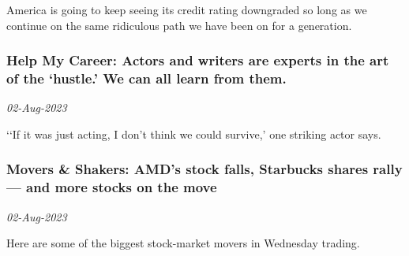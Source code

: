 America is going to keep seeing its credit rating downgraded so long as we continue on the same ridiculous path we have been on for a generation.
\subsubsection{Help My Career: Actors and writers are experts in the art of the ‘hustle.’ We can all learn from them. \href{http://www.marketwatch.com/news/story.asp?guid=%7B20C06575-04D4-B545-7238-437B0D9E1615%7D&siteid=rss&rss=1}{\ding{225}}}
\textit{02-Aug-2023}

‘‘If it was just acting, I don’t think we could survive,' one striking actor says.
\subsubsection{Movers \& Shakers: AMD’s stock falls, Starbucks shares rally — and more stocks on the move \href{http://www.marketwatch.com/news/story.asp?guid=%7B20C06575-04D4-B545-723E-21C5D0675CBE%7D&siteid=rss&rss=1}{}}
\textit{02-Aug-2023}

Here are some of the biggest stock-market movers in Wednesday trading.
